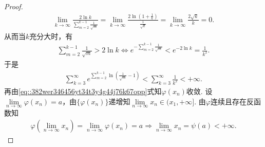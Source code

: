 \documentclass[../../main.tex]{subfiles}
\begin{document}
\begin{proof}
\begin{align*}
\lim_{k \to \infty} \frac{2\ln k}{\sum\limits_{m=2}^{k-1} \frac{1}{\sqrt{m}}} = \lim_{k \to \infty} \frac{2\ln\left( 1 + \frac{1}{k} \right)}{\frac{1}{\sqrt{k}}} = \lim_{k \to \infty} \frac{2\sqrt{k}}{k} = 0.
\end{align*}
从而当$k$充分大时，有
\begin{align*}
\sum\limits_{m=2}^{k-1} \frac{1}{\sqrt{m}} > 2\ln k \Longleftrightarrow e^{-\sum\limits_{m=2}^{k-1} \frac{1}{\sqrt{m}}} < e^{-2\ln k} = \frac{1}{k^2}.
\end{align*}
于是
\begin{align*}
\sum\limits_{k=3}^{\infty} e^{\sum\limits_{m=2}^{k-1} \ln\left( \frac{1}{\sqrt{m}} - 1 \right)} < \sum\limits_{k=3}^{\infty} \frac{1}{k^2} < +\infty.
\end{align*}
再由\eqref{eq::382wer346456yt34t3y4g44j76k67opp}式知$\varphi(x_n)$收敛. 设$\lim\limits_{n \to \infty} \varphi(x_n) = a$，由$\{\varphi(x_n)\}$递增知$\lim\limits_{n \to \infty} x_n \in (x_1, +\infty]$. 由$\varphi$连续且存在反函数知
\begin{align*}
\varphi\left( \lim_{n \to \infty} x_n \right) = \lim_{n \to \infty} \varphi(x_n) = a \Longrightarrow \lim_{n \to \infty} x_n = \psi(a) < +\infty.
\end{align*}

\end{proof}
\end{document}
